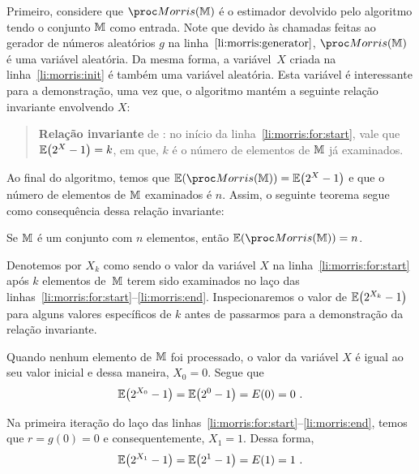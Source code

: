 Primeiro, considere que $\morrisestimator$ é o estimador devolvido pelo algoritmo tendo o conjunto $\mathbb{M}$ como entrada. 
Note que devido às chamadas feitas ao gerador de números aleatórios $g$ na linha~$\ref{li:morris:generator}$, 
$\morrisestimator$ é uma variável aleatória. Da mesma forma, a variável~$X$ criada na linha~\ref{li:morris:init} é 
também uma variável aleatória. Esta variável é interessante para a demonstração, uma vez que, o algoritmo  
mantém a seguinte relação invariante envolvendo $X$:

\begin{quote}
  \textbf{Relação invariante} de : no início da linha~\ref{li:morris:for:start}, vale que 
  $\mathbb{E}\big(2^{X} - 1\big) = k$, em que, $k$ é o número de elementos de $\mathbb{M}$ já examinados. 
\end{quote}

Ao final do algoritmo, temos que $\Ebb(\morrisestimator)=\Ebb\big(2^{X}-1\big)$ e que o número de elementos de $\mathbb{M}$ 
examinados é $n$. Assim, o seguinte teorema segue como consequência dessa relação invariante:

\begin{theorem}
  \label{morris:theorem:expected_value}
  Se $\mathbb{M}$ é um conjunto com $n$ elementos, então $\Ebb(\morrisestimator) = n$.
\end{theorem}

Denotemos por $X_k$ como sendo o valor da variável $X$ na linha~\ref{li:morris:for:start} após $k$ elementos de~$\mathbb{M}$ 
terem sido examinados no laço das linhas~\ref{li:morris:for:start}--\ref{li:morris:end}. Inspecionaremos o valor de 
$\mathbb{E}\big(2^{X_k} - 1\big)$ para alguns valores específicos de $k$ antes de passarmos para a demonstração da relação 
invariante.

Quando nenhum elemento de $\mathbb{M}$ foi processado, o valor da variável $X$ é igual ao seu valor inicial e dessa maneira,
$X_0 = 0$. Segue que
\[ \mathbb{E}\big(2^{X_0} - 1\big) = \mathbb{E}\big(2^0 - 1\big) = E(0) = 0 \ .\]

Na primeira iteração do laço das linhas~\ref{li:morris:for:start}--\ref{li:morris:end}, temos que $r = g(0) = 0$ e 
consequentemente, $X_1 = 1$. Dessa forma, 
\[ \mathbb{E}\big(2^{X_1} - 1\big) = \mathbb{E}\big(2^1 - 1\big) = E(1) = 1 \ .\]


